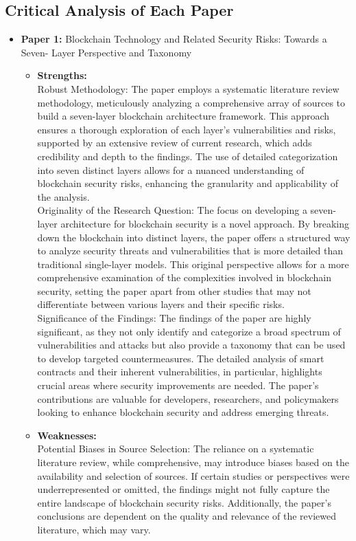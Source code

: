 \documentclass[12pt,a4paper]{article}
\begin{document}
\subsection{Critical Analysis of Each Paper}
\begin{itemize}

\item \textbf{Paper 1:} Blockchain Technology and Related Security Risks: Towards a Seven-
Layer Perspective and Taxonomy
\begin{itemize}
 \item \textbf{Strengths:} 
        \\ 
Robust Methodology: The paper employs a systematic literature review methodology, meticulously analyzing a comprehensive array of sources to build a seven-layer blockchain architecture framework. This approach ensures a thorough exploration of each layer’s vulnerabilities and risks, supported by an extensive review of current research, which adds credibility and depth to the findings. The use of detailed categorization into seven distinct layers allows for a nuanced understanding of blockchain security risks, enhancing the granularity and applicability of the analysis.
\\
Originality of the Research Question: The focus on developing a seven-layer architecture for blockchain security is a novel approach. By breaking down the blockchain into distinct layers, the paper offers a structured way to analyze security threats and vulnerabilities that is more detailed than traditional single-layer models. This original perspective allows for a more comprehensive examination of the complexities involved in blockchain security, setting the paper apart from other studies that may not differentiate between various layers and their specific risks.
\\
Significance of the Findings: The findings of the paper are highly significant, as they not only identify and categorize a broad spectrum of vulnerabilities and attacks but also provide a taxonomy that can be used to develop targeted countermeasures. The detailed analysis of smart contracts and their inherent vulnerabilities, in particular, highlights crucial areas where security improvements are needed. The paper’s contributions are valuable for developers, researchers, and policymakers looking to enhance blockchain security and address emerging threats.
\item \textbf{Weaknesses:} 
         \\
Potential Biases in Source Selection: The reliance on a systematic literature review, while comprehensive, may introduce biases based on the availability and selection of sources. If certain studies or perspectives were underrepresented or omitted, the findings might not fully capture the entire landscape of blockchain security risks. Additionally, the paper’s conclusions are dependent on the quality and relevance of the reviewed literature, which may vary.

\end{itemize}
\end{itemize}
\end{document}
